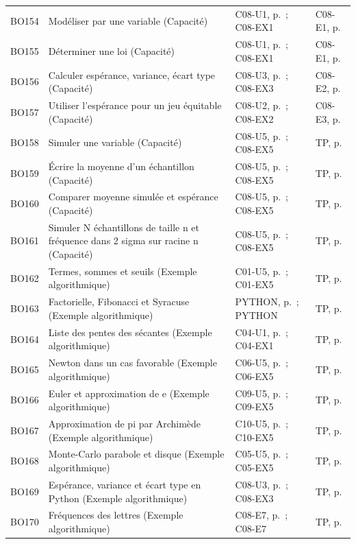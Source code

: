 \begin{longtable}{p{.1\linewidth}p{.43\linewidth}p{.19\linewidth}p{.16\linewidth}}
BO154 & Modéliser par une variable (Capacité) & C08-U1, p.\,\pageref{C08-U1} ; C08-EX1 & C08-E1, p.\,\pageref{C08-E1} \\
BO155 & Déterminer une loi (Capacité) & C08-U1, p.\,\pageref{C08-U1} ; C08-EX1 & C08-E1, p.\,\pageref{C08-E1} \\
BO156 & Calculer espérance, variance, écart type (Capacité) & C08-U3, p.\,\pageref{C08-U3} ; C08-EX3 & C08-E2, p.\,\pageref{C08-E2} \\
BO157 & Utiliser l’espérance pour un jeu équitable (Capacité) & C08-U2, p.\,\pageref{C08-U2} ; C08-EX2 & C08-E3, p.\,\pageref{C08-E3} \\
BO158 & Simuler une variable (Capacité) & C08-U5, p.\,\pageref{C08-U5} ; C08-EX5 & TP, p.\,\pageref{TP} \\
BO159 & Écrire la moyenne d’un échantillon (Capacité) & C08-U5, p.\,\pageref{C08-U5} ; C08-EX5 & TP, p.\,\pageref{TP} \\
BO160 & Comparer moyenne simulée et espérance (Capacité) & C08-U5, p.\,\pageref{C08-U5} ; C08-EX5 & TP, p.\,\pageref{TP} \\
BO161 & Simuler N échantillons de taille n et fréquence dans 2 sigma sur racine n (Capacité) & C08-U5, p.\,\pageref{C08-U5} ; C08-EX5 & TP, p.\,\pageref{TP} \\
BO162 & Termes, sommes et seuils (Exemple algorithmique) & C01-U5, p.\,\pageref{C01-U5} ; C01-EX5 & TP, p.\,\pageref{TP} \\
BO163 & Factorielle, Fibonacci et Syracuse (Exemple algorithmique) & PYTHON, p.\,\pageref{PYTHON} ; PYTHON & TP, p.\,\pageref{TP} \\
BO164 & Liste des pentes des sécantes (Exemple algorithmique) & C04-U1, p.\,\pageref{C04-U1} ; C04-EX1 & TP, p.\,\pageref{TP} \\
BO165 & Newton dans un cas favorable (Exemple algorithmique) & C06-U5, p.\,\pageref{C06-U5} ; C06-EX5 & TP, p.\,\pageref{TP} \\
BO166 & Euler et approximation de e (Exemple algorithmique) & C09-U5, p.\,\pageref{C09-U5} ; C09-EX5 & TP, p.\,\pageref{TP} \\
BO167 & Approximation de pi par Archimède (Exemple algorithmique) & C10-U5, p.\,\pageref{C10-U5} ; C10-EX5 & TP, p.\,\pageref{TP} \\
BO168 & Monte-Carlo parabole et disque (Exemple algorithmique) & C05-U5, p.\,\pageref{C05-U5} ; C05-EX5 & TP, p.\,\pageref{TP} \\
BO169 & Espérance, variance et écart type en Python (Exemple algorithmique) & C08-U3, p.\,\pageref{C08-U3} ; C08-EX3 & TP, p.\,\pageref{TP} \\
BO170 & Fréquences des lettres (Exemple algorithmique) & C08-E7, p.\,\pageref{C08-E7} ; C08-E7 & TP, p.\,\pageref{TP} \\
\bottomrule\end{longtable}\normalsize